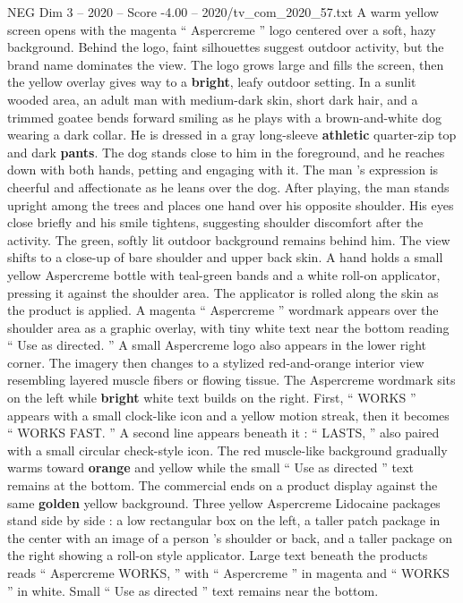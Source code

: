 \begin{textsample}{NEG Dim 3 – 2020 – Score -4.00 – 2020/tv\_com\_2020\_57.txt}  \label{ex:f3_neg_025}
A warm yellow screen opens with the magenta “ Aspercreme ” logo centered over a soft, hazy background.
Behind the logo, faint silhouettes suggest outdoor activity, but the brand name dominates the view.
The logo grows large and fills the screen, then the yellow overlay gives way to a \textbf{bright}, leafy outdoor setting.
In a sunlit wooded area, an adult man with medium-dark skin, short dark hair, and a trimmed goatee bends forward smiling as he plays with a brown-and-white dog wearing a dark collar.
He is dressed in a gray long-sleeve \textbf{athletic} quarter-zip top and dark \textbf{pants}.
The dog stands close to him in the foreground, and he reaches down with both hands, petting and engaging with it.
The man ’s expression is cheerful and affectionate as he leans over the dog.
After playing, the man stands upright among the trees and places one hand over his opposite shoulder.
His eyes close briefly and his smile tightens, suggesting shoulder discomfort after the activity.
The green, softly lit outdoor background remains behind him.
The view shifts to a close-up of bare shoulder and upper back skin.
A hand holds a small yellow Aspercreme bottle with teal-green bands and a white roll-on applicator, pressing it against the shoulder area.
The applicator is rolled along the skin as the product is applied.
A magenta “ Aspercreme ” wordmark appears over the shoulder area as a graphic overlay, with tiny white text near the bottom reading “ Use as directed. ” A small Aspercreme logo also appears in the lower right corner.
The imagery then changes to a stylized red-and-orange interior view resembling layered muscle fibers or flowing tissue.
The Aspercreme wordmark sits on the left while \textbf{bright} white text builds on the right.
First, “ WORKS ” appears with a small clock-like icon and a yellow motion streak, then it becomes “ WORKS FAST. ” A second line appears beneath it : “ LASTS, ” also paired with a small circular check-style icon.
The red muscle-like background gradually warms toward \textbf{orange} and yellow while the small “ Use as directed ” text remains at the bottom.
The commercial ends on a product display against the same \textbf{golden} yellow background.
Three yellow Aspercreme Lidocaine packages stand side by side : a low rectangular box on the left, a taller patch package in the center with an image of a person ’s shoulder or back, and a taller package on the right showing a roll-on style applicator.
Large text beneath the products reads “ Aspercreme WORKS, ” with “ Aspercreme ” in magenta and “ WORKS ” in white.
Small “ Use as directed ” text remains near the bottom.

\end{textsample}
